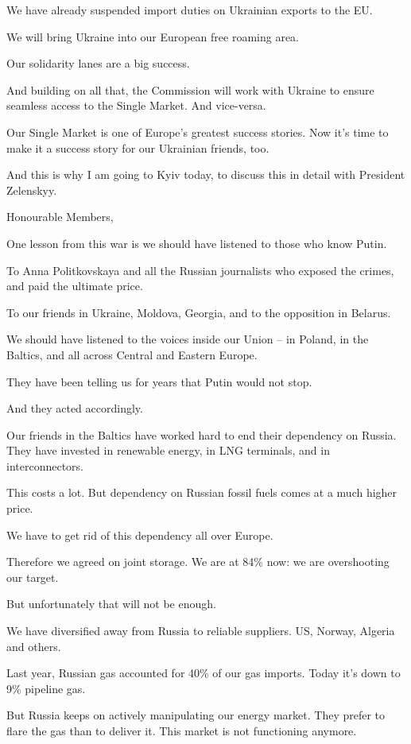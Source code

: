 \documentclass[a4paper,11pt]{article}
\begin{document}
We have already suspended import duties on Ukrainian exports to the EU.

We will bring Ukraine into our European free roaming area.

Our solidarity lanes are a big success.

And building on all that, the Commission will work with Ukraine to ensure seamless access to the Single Market. And vice-versa.

Our Single Market is one of Europe's greatest success stories. Now it's time to make it a success story for our Ukrainian friends, too.

And this is why I am going to Kyiv today, to discuss this in detail with President Zelenskyy.

 

Honourable Members,

One lesson from this war is we should have listened to those who know Putin.

To Anna Politkovskaya and all the Russian journalists who exposed the crimes, and paid the ultimate price.

To our friends in Ukraine, Moldova, Georgia, and to the opposition in Belarus.

We should have listened to the voices inside our Union – in Poland, in the Baltics, and all across Central and Eastern Europe.

They have been telling us for years that Putin would not stop.

And they acted accordingly.

Our friends in the Baltics have worked hard to end their dependency on Russia. They have invested in renewable energy, in LNG terminals, and in interconnectors.

This costs a lot. But dependency on Russian fossil fuels comes at a much higher price.

We have to get rid of this dependency all over Europe.

Therefore we agreed on joint storage. We are at 84\% now: we are overshooting our target.

But unfortunately that will not be enough.

We have diversified away from Russia to reliable suppliers. US, Norway, Algeria and others.

Last year, Russian gas accounted for 40\% of our gas imports. Today it's down to 9\% pipeline gas.

But Russia keeps on actively manipulating our energy market. They prefer to flare the gas than to deliver it. This market is not functioning anymore.
\end{document}
